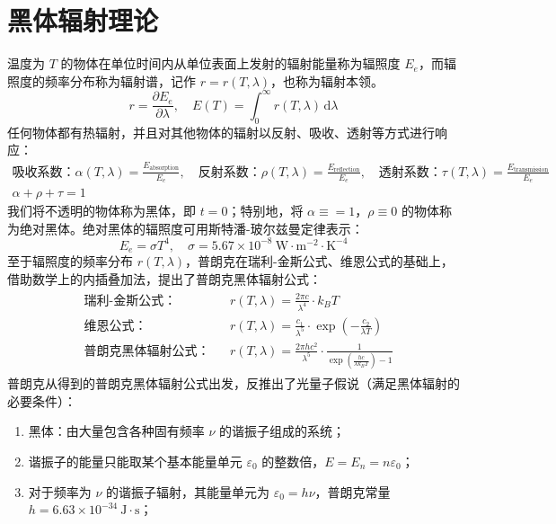\documentclass[UTF8]{report}
\theoremstyle{MyLineTheoremStyle} %
\theoremstyle{MyBlockTheoremStyle} %
\theoremstyle{MySubsubsectionStyle} %
\begin{document}
\section{黑体辐射理论}

温度为 $T$ 的物体在单位时间内从单位表面上发射的辐射能量称为辐照度 $E_e$，而辐照度的频率分布称为辐射谱，记作 $r = r(T, \lambda)$，也称为辐射本领。
\begin{equation}
r = \frac{\partial E_e }{\partial \lambda },\quad E(T) = \int_0^{\infty} r(T, \lambda) \, \mathrm{d} \lambda
\end{equation}
任何物体都有热辐射，并且对其他物体的辐射以反射、吸收、透射等方式进行响应：
\begin{gather}
\text{吸收系数：} \alpha(T, \lambda) = \frac{E_{\text{absorption}}}{E_e},\quad \text{反射系数：} \rho(T, \lambda) = \frac{E_{\text{reflection}}}{E_e},\quad \text{透射系数：} \tau(T, \lambda) = \frac{E_{\text{transmission}}}{E_e} \\
\alpha + \rho + \tau = 1
\end{gather}
我们将不透明的物体称为黑体，即 $t = 0$；特别地，将 $\alpha \equiv = 1$，$\rho \equiv 0$ 的物体称为绝对黑体。绝对黑体的辐照度可用斯特潘-玻尔兹曼定律表示：
\begin{equation}
E_e = \sigma T^4,\quad \sigma = 5.67 \times 10^{-8} \ \mathrm{W \cdot m^{-2} \cdot K^{-4}}
\end{equation}
至于辐照度的频率分布 $r(T, \lambda)$，普朗克在瑞利-金斯公式、维恩公式的基础上，借助数学上的内插叠加法，提出了普朗克黑体辐射公式：
\begin{gather}
    \begin{aligned}
        &\text{瑞利-金斯公式：} &&r(T, \lambda) = \frac{2 \pi c}{\lambda^4} \cdot k_B T\\
        &\text{维恩公式：} &&r(T, \lambda) = \frac{c_1}{\lambda^5} \cdot \exp \left( - \frac{c_2}{\lambda T}\right) \\ 
        &\text{普朗克黑体辐射公式：} &&r(T, \lambda) = \frac{2 \pi h c^2}{\lambda^5} \cdot \frac{1}{ \exp \left(\frac{hc}{\lambda k_BT}\right) - 1}
    \end{aligned}
\end{gather}
普朗克从得到的普朗克黑体辐射公式出发，反推出了光量子假说（满足黑体辐射的必要条件）：
\begin{enumerate}
\item 黑体：由大量包含各种固有频率 $\nu$ 的谐振子组成的系统；
\item 谐振子的能量只能取某个基本能量单元 $\varepsilon_0$ 的整数倍，$E = E_n = n \varepsilon_0$；
\item 对于频率为 $\nu$ 的谐振子辐射，其能量单元为 $\varepsilon_0 = h \nu$，普朗克常量 $h = 6.63 \times 10^{-34} \ \mathrm{J \cdot s}$；
\end{enumerate}
\end{document}
